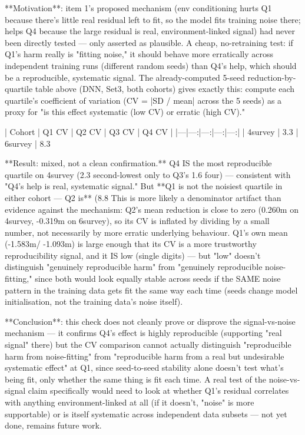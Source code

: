 **Motivation**: item 1's proposed mechanism (env conditioning hurts Q1 because there's little real
residual left to fit, so the model fits training noise there; helps Q4 because the large residual
is real, environment-linked signal) had never been directly tested — only asserted as plausible.
A cheap, no-retraining test: if Q1's harm really is "fitting noise," it should behave more
erratically across independent training runs (different random seeds) than Q4's help, which
should be a reproducible, systematic signal. The already-computed 5-seed reduction-by-quartile
table above (DNN, Set3, both cohorts) gives exactly this: compute each quartile's coefficient of
variation (CV = |SD / mean| across the 5 seeds) as a proxy for "is this effect systematic
(low CV) or erratic (high CV)."

| Cohort | Q1 CV | Q2 CV | Q3 CV | Q4 CV |
|---|---:|---:|---:|---:|
| 4survey | 3.3%
| 6survey | 8.3%

**Result: mixed, not a clean confirmation.** Q4 IS the most reproducible quartile on 4survey (2.3%
second-lowest only to Q3's 1.6%
four) — consistent with "Q4's help is real, systematic signal." But **Q1 is not the noisiest
quartile in either cohort — Q2 is** (8.8%
This is more likely a denominator artifact than evidence against the mechanism: Q2's mean reduction
is close to zero (0.260m on 4survey, -0.319m on 6survey), so its CV is inflated by dividing by a
small number, not necessarily by more erratic underlying behaviour. Q1's own mean (-1.583m/
-1.093m) is large enough that its CV is a more trustworthy reproducibility signal, and it IS low
(single digits) — but "low" doesn't distinguish "genuinely reproducible harm" from "genuinely
reproducible noise-fitting," since both would look equally stable across seeds if the SAME noise
pattern in the training data gets fit the same way each time (seeds change model initialisation,
not the training data's noise itself).

**Conclusion**: this check does not cleanly prove or disprove the signal-vs-noise mechanism — it
confirms Q4's effect is highly reproducible (supporting "real signal" there) but the CV comparison
cannot actually distinguish "reproducible harm from noise-fitting" from "reproducible harm from a
real but undesirable systematic effect" at Q1, since seed-to-seed stability alone doesn't test
what's being fit, only whether the same thing is fit each time. A real test of the noise-vs-signal
claim specifically would need to look at whether Q1's residual correlates with anything
environment-linked at all (if it doesn't, "noise" is more supportable) or is itself systematic
across independent data subsets — not yet done, remains future work.
